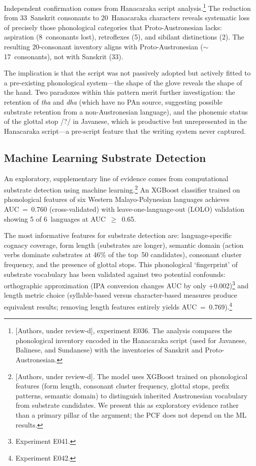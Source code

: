 \documentclass[12pt,a4paper]{article}
\begin{document}
Independent confirmation comes from Hanacaraka script analysis.\footnote{[Authors, under review-d], experiment E036. The analysis compares the phonological inventory encoded in the Hanacaraka script (used for Javanese, Balinese, and Sundanese) with the inventories of Sanskrit and Proto-Austronesian.} The reduction from 33~Sanskrit consonants to 20~Hanacaraka characters reveals systematic loss of precisely those phonological categories that Proto-Austronesian lacks: aspiration (8~consonants lost), retroflexes (5), and sibilant distinctions (2). The resulting 20-consonant inventory aligns with Proto-Austronesian ($\sim$17~consonants), not with Sanskrit (33).

The implication is that the script was not passively adopted but actively fitted to a pre-existing phonological system---the shape of the glove reveals the shape of the hand. Two paradoxes within this pattern merit further investigation: the retention of \emph{tha} and \emph{dha} (which have no PAn source, suggesting possible substrate retention from a non-Austronesian language), and the phonemic status of the glottal stop /?/ in Javanese, which is productive but unrepresented in the Hanacaraka script---a pre-script feature that the writing system never captured.

\subsection{Machine Learning Substrate Detection}

An exploratory, supplementary line of evidence comes from computational substrate detection using machine learning.\footnote{[Authors, under review-d]. The model uses XGBoost trained on phonological features (form length, consonant cluster frequency, glottal stops, prefix patterns, semantic domain) to distinguish inherited Austronesian vocabulary from substrate candidates. We present this as exploratory evidence rather than a primary pillar of the argument; the PCF does not depend on the ML results.} An XGBoost classifier trained on phonological features of six Western Malayo-Polynesian languages achieves AUC~=~0.760 (cross-validated) with leave-one-language-out (LOLO) validation showing 5 of 6~languages at AUC~$\geq$~0.65.

The most informative features for substrate detection are: language-specific cognacy coverage, form length (substrates are longer), semantic domain (action verbs dominate substrates at 46\% of the top~50 candidates), consonant cluster frequency, and the presence of glottal stops. This phonological `fingerprint' of substrate vocabulary has been validated against two potential confounds: orthographic approximation (IPA conversion changes AUC by only +0.002)\footnote{Experiment E041.} and length metric choice (syllable-based versus character-based measures produce equivalent results; removing length features entirely yields AUC~=~0.769).\footnote{Experiment E042.}
\end{document}
